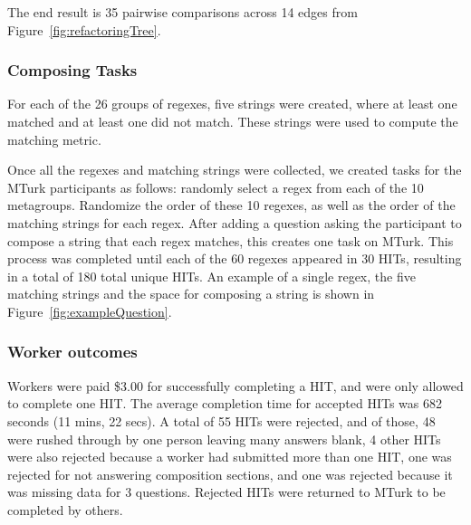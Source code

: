 The end result is 35 pairwise comparisons across 14 edges from Figure~\ref{fig:refactoringTree}.

\subsubsection{Composing Tasks}
For each of the 26 groups of regexes, five strings were created, where at least one matched and at least one did not match. These strings were used to compute the matching metric.

Once all the regexes and matching strings were collected, we created tasks for the MTurk participants as follows:
randomly select a regex from each of the 10 metagroups. Randomize the order of these 10 regexes, as well as the order of the matching strings for each regex. After adding a question asking the participant to compose a string that each regex matches, this creates one task on MTurk.   This process was completed until each of the 60 regexes appeared in 30 HITs, resulting in a total of 180 total unique HITs.
An example of a single regex, the five matching strings and the space for composing a string is shown in Figure~\ref{fig:exampleQuestion}.
\subsubsection{Worker outcomes}
Workers were paid \$3.00 for successfully completing a HIT, and were only allowed to complete  one HIT.  The average completion time for accepted HITs was 682 seconds (11 mins, 22 secs).
A total of 55 HITs were rejected, and  of those, 48 were rushed through by one person leaving many answers blank, 4 other HITs were also rejected because a worker had submitted more than one HIT, one was rejected for not answering composition sections, and one was rejected because it was missing data for 3 questions.  Rejected HITs were returned to MTurk to be completed by others.
